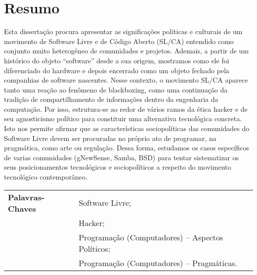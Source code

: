 \chapter*{Resumo}	

Esta dissertação procura apresentar as significações políticas e culturais de um movimento de Software Livre e de Código Aberto (SL/CA) entendido como conjunto muito heterogêneo de comunidades e projetos. Ademais, a partir de um histórico do objeto “software” desde a sua origem, mostramos como ele foi diferenciado do hardware e depois encerrado como um objeto fechado pela companhias de software nascentes. Nesse contexto, o movimento SL/CA aparece tanto uma reação ao fenômeno de blackboxing, como uma continuação da tradição de compartilhamento de informações dentro da engenharia da computação. Por isso, estrutura-se ao redor de vários ramos da ética hacker e de seu agnosticismo político para constituir uma alternativa tecnológica concreta. Isto nos permite afirmar que as características sociopolíticas das comunidades do Software Livre devem ser procuradas no próprio ato de programar, na pragmática, como arte ou regulação. Dessa forma, estudamos os casos específicos de varias comunidades (gNewSense, Samba, BSD) para tentar sistematizar os seus posicionamentos tecnológicos e sociopolíticos a respeito do movimento tecnológico contemporâneo.

\vspace{2cm}

\begin{tabular}{ll}
\textbf{Palavras-Chaves} & Software Livre;\\
& Hacker;\\
& Programação (Computadores) – Aspectos Políticos;\\
& Programação (Computadores) – Pragmáticas.\\
\end{tabular}

